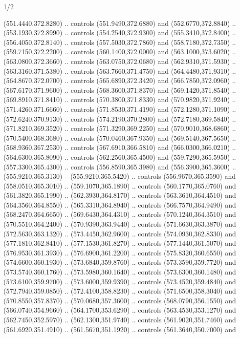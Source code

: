 \begin{flagdescription}{1/2}
\begin{scope}[xshift=0.5\flaglength,yshift=0.5\flagwidth,scale=\flagwidth/759]
\begin{scope}[y=0.8pt, x=0.8pt, yscale=-1,shift={(-720,-480)}]
\begin{scope}[cm={{1.14637,0.0,0.0,1.17117,(33.17849,82.1384)}}]
  (551.4440,372.8280) .. controls (551.9490,372.6880) and (552.6770,372.8840) ..
  (553.1930,372.8990) .. controls (554.2540,372.9300) and (555.3410,372.8400) ..
  (556.4050,372.8140) .. controls (557.5030,372.7860) and (558.7180,372.7350) ..
  (559.7150,372.2200) .. controls (560.1400,372.0000) and (563.1000,373.6020) ..
  (563.0800,372.3660) .. controls (563.0750,372.0680) and (562.9310,371.5930) ..
  (563.3160,371.5380) .. controls (563.7660,371.4750) and (564.4480,371.9310) ..
  (564.8670,372.0700) .. controls (565.6890,372.3420) and (566.7850,372.0960) ..
  (567.6170,371.9600) .. controls (568.3600,371.8370) and (569.1420,371.8540) ..
  (569.8910,371.8410) .. controls (570.3800,371.8330) and (570.9820,371.9240) ..
  (571.4260,371.6660) .. controls (571.8530,371.4190) and (572.1280,371.1090) ..
  (572.6240,370.9130) .. controls (574.2190,370.2800) and (572.7180,369.5840) ..
  (571.8210,369.3520) .. controls (571.3290,369.2250) and (570.9010,368.6860) ..
  (570.5400,368.3680) .. controls (570.0460,367.9350) and (569.5140,367.5650) ..
  (568.9360,367.2530) .. controls (567.6910,366.5810) and (566.0300,366.0210) ..
  (564.6300,365.8090) .. controls (562.2560,365.4500) and (559.7290,365.5950) ..
  (557.3300,365.4300) .. controls (556.8590,365.3980) and (556.3900,365.3600) ..
  (555.9210,365.3130) -- (555.9210,365.5420) .. controls (556.9670,365.3590) and
  (558.0510,365.3010) .. (559.1070,365.1890) .. controls (560.1770,365.0760) and
  (561.3820,365.1990) .. (562.3930,364.8170) .. controls (563.3610,364.4510) and
  (564.3560,364.8550) .. (565.3310,364.8940) .. controls (566.7570,364.9490) and
  (568.2470,364.6650) .. (569.6430,364.4310) .. controls (570.1240,364.3510) and
  (570.5510,364.2400) .. (570.9390,363.9440) .. controls (571.6630,363.3870) and
  (572.5630,363.1320) .. (573.4450,362.9600) .. controls (574.0930,362.8330) and
  (577.1810,362.8410) .. (577.1530,361.8270) .. controls (577.1440,361.5070) and
  (576.9530,361.3930) .. (576.6900,361.2200) .. controls (575.8320,360.6550) and
  (574.6600,360.1930) .. (573.6840,359.8760) .. controls (573.3590,359.7720) and
  (573.5740,360.1760) .. (573.5980,360.1640) .. controls (573.6300,360.1480) and
  (573.6100,359.9700) .. (573.6000,359.9390) .. controls (573.4520,359.4840) and
  (572.7940,359.0850) .. (572.4100,358.8230) .. controls (571.6500,358.3040) and
  (570.8550,357.8370) .. (570.0680,357.3600) .. controls (568.0790,356.1550) and
  (566.0740,354.9660) .. (564.1700,353.6290) .. controls (563.4530,353.1270) and
  (562.7450,352.5970) .. (562.1300,351.9740) .. controls (561.9020,351.7460) and
  (561.6920,351.4910) .. (561.5670,351.1920) .. controls (561.3640,350.7000) and

\end{scope}
\end{scope}
\end{scope}
\end{flagdescription}
